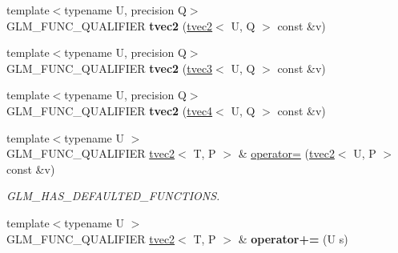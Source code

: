 \begin{DoxyCompactItemize}
\item 
\hypertarget{structglm_1_1tvec2_a2d50495ed375c14e7dadde4dc3de82ba}{{\footnotesize template$<$typename U, precision Q$>$ }\\G\-L\-M\-\_\-\-F\-U\-N\-C\-\_\-\-Q\-U\-A\-L\-I\-F\-I\-E\-R {\bfseries tvec2} (\hyperlink{structglm_1_1tvec2}{tvec2}$<$ U, Q $>$ const \&v)}\label{structglm_1_1tvec2_a2d50495ed375c14e7dadde4dc3de82ba}

\item 
\hypertarget{structglm_1_1tvec2_a9742902fc6686c11ae142a5bbc8b9c58}{{\footnotesize template$<$typename U, precision Q$>$ }\\G\-L\-M\-\_\-\-F\-U\-N\-C\-\_\-\-Q\-U\-A\-L\-I\-F\-I\-E\-R {\bfseries tvec2} (\hyperlink{structglm_1_1tvec3}{tvec3}$<$ U, Q $>$ const \&v)}\label{structglm_1_1tvec2_a9742902fc6686c11ae142a5bbc8b9c58}

\item 
\hypertarget{structglm_1_1tvec2_abd8dda4cd25f53c5fcf6565f9689e1a4}{{\footnotesize template$<$typename U, precision Q$>$ }\\G\-L\-M\-\_\-\-F\-U\-N\-C\-\_\-\-Q\-U\-A\-L\-I\-F\-I\-E\-R {\bfseries tvec2} (\hyperlink{structglm_1_1tvec4}{tvec4}$<$ U, Q $>$ const \&v)}\label{structglm_1_1tvec2_abd8dda4cd25f53c5fcf6565f9689e1a4}

\item 
\hypertarget{structglm_1_1tvec2_af214e66acab4db6f5a539ff9a161e3ba}{{\footnotesize template$<$typename U $>$ }\\G\-L\-M\-\_\-\-F\-U\-N\-C\-\_\-\-Q\-U\-A\-L\-I\-F\-I\-E\-R \hyperlink{structglm_1_1tvec2}{tvec2}$<$ T, P $>$ \& \hyperlink{structglm_1_1tvec2_af214e66acab4db6f5a539ff9a161e3ba}{operator=} (\hyperlink{structglm_1_1tvec2}{tvec2}$<$ U, P $>$ const \&v)}\label{structglm_1_1tvec2_af214e66acab4db6f5a539ff9a161e3ba}

\begin{DoxyCompactList}\small\item\em G\-L\-M\-\_\-\-H\-A\-S\-\_\-\-D\-E\-F\-A\-U\-L\-T\-E\-D\-\_\-\-F\-U\-N\-C\-T\-I\-O\-N\-S. \end{DoxyCompactList}\item 
\hypertarget{structglm_1_1tvec2_af33d9848fba46d7eeac97750536b3c49}{{\footnotesize template$<$typename U $>$ }\\G\-L\-M\-\_\-\-F\-U\-N\-C\-\_\-\-Q\-U\-A\-L\-I\-F\-I\-E\-R \hyperlink{structglm_1_1tvec2}{tvec2}$<$ T, P $>$ \& {\bfseries operator+=} (U s)}\label{structglm_1_1tvec2_af33d9848fba46d7eeac97750536b3c49}


\end{DoxyCompactItemize}
